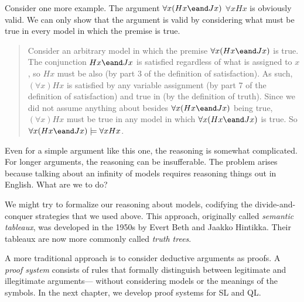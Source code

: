 

Consider one more example. The argument $\forall x(Hx \eand Jx)$ \therefore  $\forall x Hx$ is obviously valid. We can only show that the argument is valid by considering what must be true in every model in which the premise is true.
\begin{quote}
Consider an arbitrary model  in which the premise $\forall x(Hx \eand Jx)$ is true. The conjunction $Hx \eand Jx$ is satisfied regardless of what is assigned to $x$, so $Hx$ must be also (by part 3 of the definition of {satisfaction}). As such, $(\forall x) Hx$ is satisfied by any variable assignment (by part 7 of the definition of {satisfaction}) and true in  (by the definition of {truth}).
Since we did not assume anything about  besides $\forall x(Hx \eand Jx)$ being true, $(\forall x) Hx$ must be true in any model in which $\forall x(Hx \eand Jx)$ is true. So $\forall x(Hx \eand Jx) \models \forall x Hx$.
\end{quote}
Even for a simple argument like this one, the reasoning is somewhat complicated. For longer arguments, the reasoning can be insufferable. The problem arises because talking about an infinity of models requires reasoning things out in English. What are we to do?

We might try to formalize our reasoning about models, codifying the divide-and-conquer strategies that we used above. This approach, originally called \emph{semantic tableaux}, was developed in the 1950s by Evert Beth and Jaakko Hintikka. Their tableaux are now more commonly called \emph{truth trees}.

A more traditional approach is to consider deductive arguments as proofs. A \emph{proof system} consists of rules that formally distinguish between legitimate and illegitimate arguments--- without considering models or the meanings of the symbols. In the next chapter, we develop proof systems for SL and QL. 



